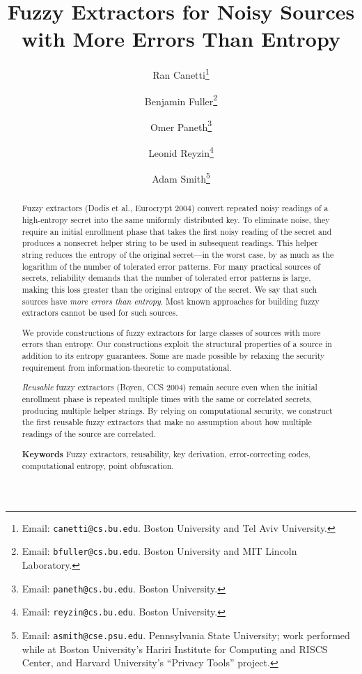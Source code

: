 \documentclass[11pt]{article}
\title{Fuzzy Extractors for Noisy Sources \\with More Errors Than Entropy}
\author{Ran Canetti\footnote{Email: {\tt canetti@cs.bu.edu}. Boston University and Tel Aviv University.} \and Benjamin Fuller\footnote{Email: {\tt bfuller@cs.bu.edu}.  Boston University and MIT Lincoln Laboratory.} \and Omer Paneth\footnote{Email: {\tt paneth@cs.bu.edu}. Boston University.} \and Leonid Reyzin\footnote{Email: {\tt reyzin@cs.bu.edu}.  Boston University.} \and Adam Smith\footnote{Email: {\tt asmith@cse.psu.edu}.  Pennsylvania State University; work performed while at Boston University's Hariri Institute for Computing and RISCS Center, and Harvard University's
``Privacy Tools'' project.} }
\begin{document}
\maketitle


\begin{abstract}
Fuzzy extractors (Dodis et al., Eurocrypt 2004) convert repeated noisy readings of a high-entropy secret into the same uniformly distributed key. To eliminate noise, they require an initial enrollment phase that takes the first noisy reading of the secret and produces a nonsecret helper string to be used in subsequent readings. This helper string reduces  the entropy of the original secret---in the worst case, by as much as the logarithm of the number of tolerated error patterns. For many practical sources of secrets, reliability demands that the number of tolerated error patterns is large, making this loss greater than the original entropy of the secret. We say that such sources have \emph{more errors than entropy}.  Most known approaches for building fuzzy extractors cannot be used for such sources.

\ifnum{}\medskip\fi

%   

We provide constructions of fuzzy extractors for large classes of sources with more errors than entropy.  Our constructions exploit the structural properties of a source in addition to its entropy guarantees. Some are made possible by relaxing the security requirement from information-theoretic to computational.

\ifnum{}\medskip\fi

\emph{Reusable} fuzzy extractors (Boyen, CCS 2004)
 remain secure even when the initial enrollment phase is repeated multiple times with the same or correlated secrets, producing multiple helper strings. By relying on computational security, we construct the first reusable fuzzy extractors that make no assumption about how multiple readings of the source are correlated.


\medskip

\textbf{Keywords} Fuzzy extractors, reusability, key derivation, error-correcting codes, computational entropy, point obfuscation.
\end{abstract}
\end{document}
